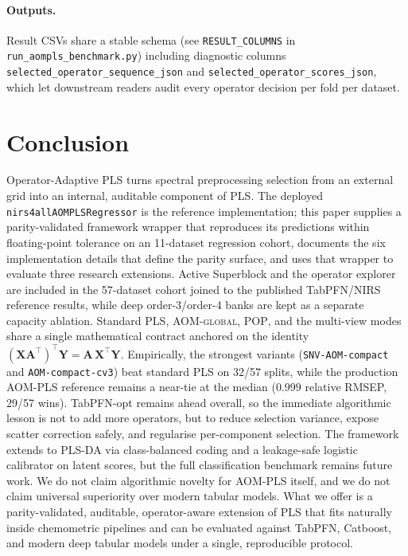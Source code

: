 \documentclass[review,a4paper]{elsarticle}
\newcommand{\Xmat}{\mathbf{X}}
\newcommand{\Ymat}{\mathbf{Y}}
\newcommand{\Amat}{\mathbf{A}}
\newcommand{\AOM}{\textsc{AOM}\xspace}
\newcommand{\POP}{\textsc{POP}\xspace}
\newcommand{\PLS}{\textsc{PLS}\xspace}
\newcommand{\PLSDA}{\textsc{PLS-DA}\xspace}
\newcommand{\nirsfourall}{\texttt{nirs4all}\xspace}
\begin{document}
\paragraph{Outputs.}
Result CSVs share a stable schema (see \verb|RESULT_COLUMNS| in
\verb|run_aompls_benchmark.py|) including diagnostic columns
\verb|selected_operator_sequence_json| and
\verb|selected_operator_scores_json|, which let downstream readers
audit every operator decision per fold per dataset.

\section{Conclusion}\label{sec:conclusion}

Operator-Adaptive \PLS turns spectral preprocessing selection from an
external grid into an internal, auditable component of \PLS. The
deployed \nirsfourall \verb|AOMPLSRegressor| is the reference
implementation; this paper supplies a parity-validated framework
wrapper that reproduces its predictions within floating-point tolerance
on an 11-dataset regression cohort, documents the six implementation details that
define the parity surface, and uses that wrapper to evaluate three
research extensions. Active Superblock and the operator explorer are
included in the 57-dataset cohort joined to the published TabPFN/NIRS
reference results, while deep order-3/order-4 banks are kept as a
separate capacity ablation. Standard \PLS, \AOM-\textsc{global},
\POP, and the multi-view modes share a single mathematical contract
anchored on the identity
$(\Xmat\Amat^\top)^\top \Ymat = \Amat\,\Xmat^\top \Ymat$. Empirically,
the strongest variants (\texttt{SNV-AOM-compact} and
\texttt{AOM-compact-cv3}) beat standard \PLS on 32/57 splits, while the
production \AOM-\PLS reference remains a near-tie at the median
($0.999$ relative RMSEP, 29/57 wins). TabPFN-opt remains ahead overall,
so the immediate algorithmic lesson is not to add more operators, but
to reduce selection variance, expose scatter correction safely, and
regularise per-component selection. The framework extends to \PLSDA via
class-balanced coding and a leakage-safe logistic calibrator on latent
scores, but the full classification benchmark remains future work. We
do not claim algorithmic novelty for \AOM-\PLS itself, and we do not
claim universal superiority over modern tabular models. What we offer
is a parity-validated, auditable, operator-aware extension of \PLS that
fits naturally inside chemometric pipelines and can be evaluated
against TabPFN, Catboost, and modern deep tabular models under a
single, reproducible protocol.
\end{document}
